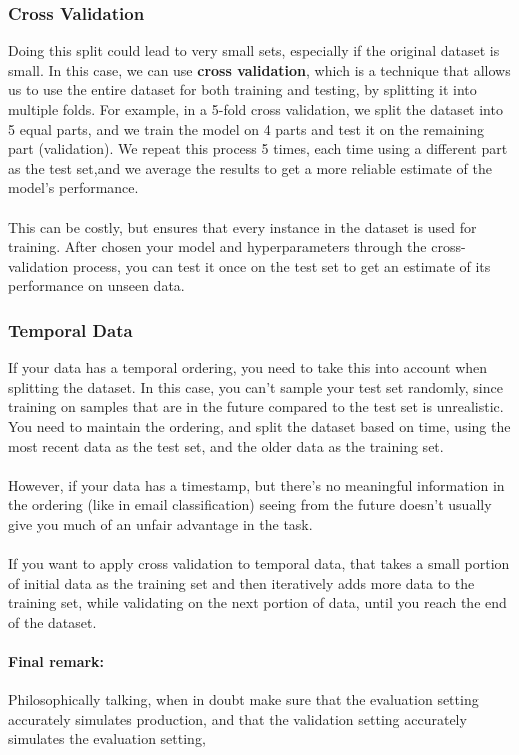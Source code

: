 \subsubsection{Cross Validation}
Doing this split could lead to very small sets, especially if the original dataset is small.
In this case, we can use \textbf{cross validation}, which is a technique that allows us to use the entire dataset for both training and testing, by splitting it into multiple folds.
For example, in a 5-fold cross validation, we split the dataset into 5 equal parts, and we train the model on 4 parts and test it on the remaining part (validation).
We repeat this process 5 times, each time using a different part as the test set,and we average the results to get a more reliable estimate of the model's performance.
\\\\
This can be costly, but ensures that every instance in the dataset is used for training.
After chosen your model and hyperparameters through the cross-validation process, you can test it once on the test set to get an estimate of its performance on unseen data.

\subsubsection{Temporal Data}
If your data has a temporal ordering, you need to take this into account when splitting the dataset.
In this case, you can't sample your test set randomly, since training on samples that are in the future compared to the test set is unrealistic.
You need to maintain the ordering, and split the dataset based on time, using the most recent data as the test set, and the older data as the training set.
\\\\
However, if your data has a timestamp, but there's no meaningful information in the ordering (like in email classification) seeing from the future doesn't usually give you much of an unfair advantage in the task.
\\\\
If you want to apply cross validation to temporal data, that takes a small portion of initial data as the training set and then iteratively adds more data to the training set, while validating on the next portion of data, until you reach the end of the dataset.

\paragraph{Final remark:}
Philosophically talking, when in doubt make sure that the evaluation setting accurately simulates production, and that the validation setting accurately simulates the evaluation setting,

